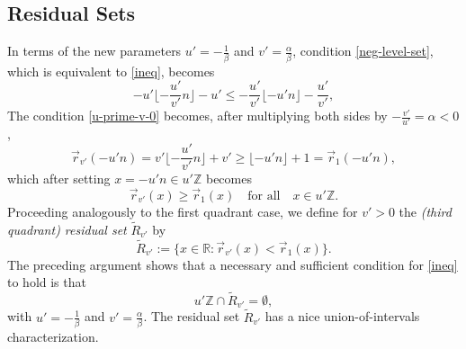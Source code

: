 \documentclass[12pt,letterpaper, reqno]{amsart}
\theoremstyle{definition}
\theoremstyle{remark}
\newcommand{\RR}{\ensuremath{\mathbb{R}}}
\newcommand{\ZZ}{\ensuremath{\mathbb{Z}}}
\newcommand{\uu}{{u'}}
\newcommand{\vv}{{v'}}
\newcommand{\R}{{R}}
\newcommand{\floor}[1]{\lfloor{#1}\rfloor}
\newcommand{\bfloor}[1]{\bigg\lfloor{#1}\bigg\rfloor}
\newcommand{\tround}{\vec{r}}
\begin{document}
\subsection{Residual Sets} \label{sec51}

In terms of the new parameters $\uu= -\frac{1}{\beta}$ and $\vv= \frac{\alpha}{\beta}$, condition \eqref{neg-level-set}, which
is equivalent to \eqref{ineq}, becomes 
\begin{equation}\label{u-prime-v-0}
-{\uu} \bfloor{ -\frac{\uu}{\vv} n} -{\uu} \le -\frac{\uu}{\vv} \floor{ -{\uu} n} - \frac{\uu}{\vv},
\end{equation}
The condition \eqref{u-prime-v-0} becomes, after multiplying  both sides by $-\frac{\vv}{\uu}= {\alpha}<0$, 
$$
 \tround_\vv(-\uu n) = \vv\bfloor{ -\frac{\uu}{\vv} n}+\vv \ge \floor{ - {\uu} n } + 1 = \tround_1(-\uu n),
$$
which after setting $x= -{\uu}n \in {\uu}\ZZ$ becomes 
\begin{equation}\label{u-prime-v-1}
\tround_{\vv}( x) \ge \tround_{1} (x) \quad \mbox{for all} \quad x \in {\uu}\ZZ.
\end{equation}
Proceeding analogously to the first quadrant case, we define 
for $\vv >0$  the  {\em (third quadrant)  residual  set} $\widetilde{R}_\vv$ by
\[ 
\widetilde{R}_\vv := \{x \in\RR: \vec{r}_{\vv}(x)< \vec{r}_1(x)\}.
\]
The  preceding argument shows that  a necessary and sufficient condition for \eqref{ineq} to hold is that
\begin{equation}\label{u-prime-v-2} 
{\uu}\ZZ \cap \widetilde{\R}_\vv = \emptyset,
\end{equation}
with $\uu = -\frac{1}{\beta}$ and $\vv = \frac{\alpha}{\beta}$.
The residual set $\widetilde{R}_\vv$ has a nice union-of-intervals characterization.
\end{document}
